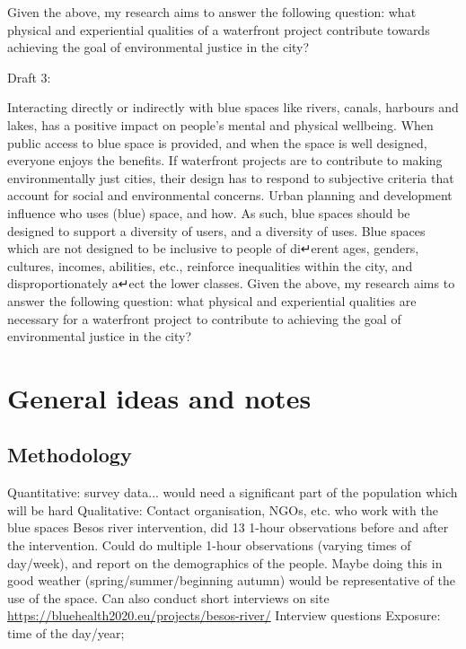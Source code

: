 \documentclass{article}
\begin{document}
Given the above, my research aims to answer the following question: what physical and experiential qualities of a waterfront project contribute towards achieving the goal of environmental justice in the city?

Draft 3:

Interacting directly or indirectly with blue spaces like rivers, canals, harbours and lakes, has a positive impact on people’s mental and physical wellbeing. When public access to blue space is provided, and when the space is well designed, everyone enjoys the benefits. If waterfront projects are to contribute to making environmentally just cities, their design has to respond to subjective criteria that account for social and environmental concerns. Urban planning and development influence who uses (blue) space, and how. As such, blue spaces should be designed to support a diversity of users, and a diversity of uses.
Blue spaces which are not designed to be inclusive to people of di↵erent ages, genders, cultures, incomes, abilities, etc., reinforce inequalities within the city, and disproportionately a↵ect the lower classes.
Given the above, my research aims to answer the following question: what physical and experiential qualities are necessary for a waterfront project to contribute to achieving the goal of environmental justice in the city?





\section{General ideas and notes}

\subsection{Methodology}

\begin{outline}
	\1 Quantitative: survey data... would need a significant part of the population which will be hard
	\1 Qualitative: 
		\2 Contact organisation, NGOs, etc. who work with the blue spaces
		\2 Besos river intervention, did 13 1-hour observations before and after the intervention. Could do multiple 1-hour observations (varying times of day/week), and report on the demographics of the people. Maybe doing this in good weather (spring/summer/beginning autumn) would be representative of the use of the space. Can also conduct short interviews on site  \url{https://bluehealth2020.eu/projects/besos-river/}
	\1 Interview questions
		\2 Exposure: time of the day/year; 
\end{outline}
\end{document}
